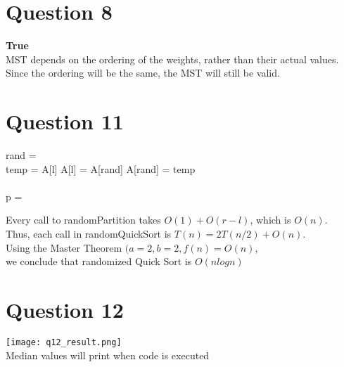 \documentclass{article}
\begin{document}
	
	\section{Question 8}
	\textbf{True} \\
	MST depends on the ordering of the weights, rather than their actual values. Since the ordering will be the same, the MST will still be valid.	
	\pagebreak
	
	\section{Question 11}
	
	\begin{algorithmic}
			\State rand =  \\
			\State temp = A[l] 
			\State A[l] = A[rand] 
			\State A[rand] = temp \\
			\State \Return {}
		\EndFunction \\
		
				\State p = 
				\State {}
				\State {}
			\EndIf
		\EndFunction \\
	\end{algorithmic} 

	Every call to randomPartition takes $O(1) + O(r - l)$, which is $O(n)$. \\
	Thus, each call in randomQuickSort is $T(n) = 2T(n/2) + O(n)$. \\
	Using the Master Theorem $(a = 2, b = 2, f(n) = O(n)$, \\
	we conclude that randomized Quick Sort is $O(n log n)$
	
	\section{Question 12}
	\begin{center}
		\texttt{[image: q12\_result.png]} \\ 
		Median values will print when code is executed
	\end{center}
	
\end{document}
